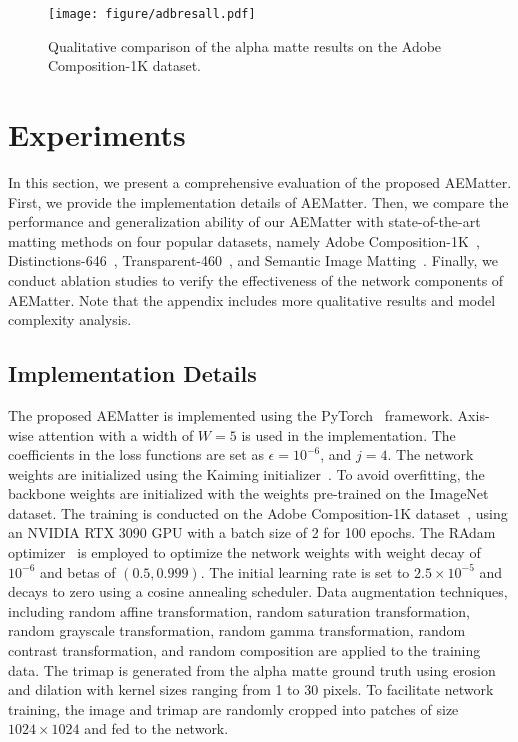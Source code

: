\documentclass[10pt,twocolumn,letterpaper]{article}
\begin{document}
\begin{figure*}[th]
\texttt{[image: figure/adbresall.pdf]}
  \vspace{-0.5cm}
	\caption{Qualitative comparison of the alpha matte results on the Adobe Composition-1K dataset.  }
	\label{fig:aim}
 \vspace{-0.2cm}
\end{figure*}


\section{Experiments}
In this section, we present a comprehensive evaluation of the proposed AEMatter. 
First, we provide the implementation details of AEMatter.
Then, we compare the performance and  generalization ability of our AEMatter with state-of-the-art matting methods on four popular datasets, namely Adobe Composition-1K~\cite{xu2017deep}, Distinctions-646~\cite{2020Attention},  Transparent-460~\cite{cai2022TransMatting}, and Semantic Image Matting~\cite{sun2021sim}.
Finally, we conduct ablation studies to verify the effectiveness of the network components of AEMatter.
Note that the appendix includes more qualitative results and model complexity analysis.

\subsection{Implementation Details}

The proposed AEMatter is implemented using the PyTorch~\cite{NEURIPS2019_9015} framework.
Axis-wise attention with a width of $W=5$ is used in the implementation. 
The coefficients in the loss functions are set as $\epsilon = 10^{-6}$, and $j = 4$.
The network weights are initialized using the Kaiming initializer~\cite{he2015delving}. 
To avoid overfitting, the backbone weights are initialized with the weights pre-trained on the ImageNet~\cite{deng2009imagenet} dataset.
The training is conducted on the Adobe Composition-1K dataset~\cite{xu2017deep}, using an NVIDIA RTX 3090 GPU with a batch size of 2 for 100 epochs. 
The RAdam optimizer~\cite{liu2019radam} is employed to optimize the network weights with weight decay of $10^{-6}$ and betas of $(0.5, 0.999)$.
The initial learning rate is set to $2.5 \times 10^{-5}$ and decays to zero using a cosine annealing scheduler.
Data augmentation techniques, including random affine transformation, random saturation transformation, random grayscale transformation, random gamma transformation, random contrast transformation, and random composition are applied to the training data.
The trimap is generated from the alpha matte ground truth using erosion and dilation with kernel sizes ranging from 1 to 30 pixels. 
To facilitate network training, the image and trimap are randomly cropped into patches of size $1024 \times 1024$ and fed to the network.
\end{document}

